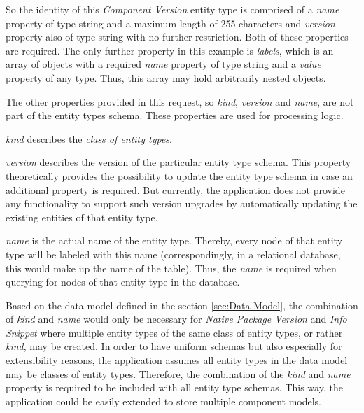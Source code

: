 So the identity of this \emph{Component Version} entity type is comprised of a \emph{name} property of type string and a maximum length of 255 characters and \emph{version} property also of type string with no further restriction. Both of these properties are required. The only further property in this example is \emph{labels}, which is an array of objects with a required \emph{name} property of type string and a \emph{value} property of any type. Thus, this array may hold arbitrarily nested objects.\par 
The other properties provided in this request, so \emph{kind}, \emph{version} and \emph{name}, are not part of the entity types schema. These properties are used for processing logic.\par 
\emph{kind} describes the \emph{class of entity types}.\par 
\emph{version} describes the version of the particular entity type schema. This property theoretically provides the possibility to update the entity type schema in case an additional property is required. But currently, the application does not provide any functionality to support such version upgrades by automatically updating the existing entities of that entity type.\par 
\emph{name} is the actual name of the entity type. Thereby, every node of that entity type will be labeled with this name (correspondingly, in a relational database, this would make up the name of the table). Thus, the \emph{name} is required when querying for nodes of that entity type in the database.\par
Based on the data model defined in the section \ref{sec:Data Model}, the combination of \emph{kind} and \emph{name} would only be necessary for \emph{Native Package Version} and \emph{Info Snippet} where multiple entity types of the same class of entity types, or rather \emph{kind}, may be created. In order to have uniform schemas but also especially for extensibility reasons, the application assumes all entity types in the data model may be classes of entity types. Therefore, the combination of the \emph{kind} and \emph{name} property is required to be included with all entity type schemas. This way, the application could be easily extended to store multiple component models.\\

